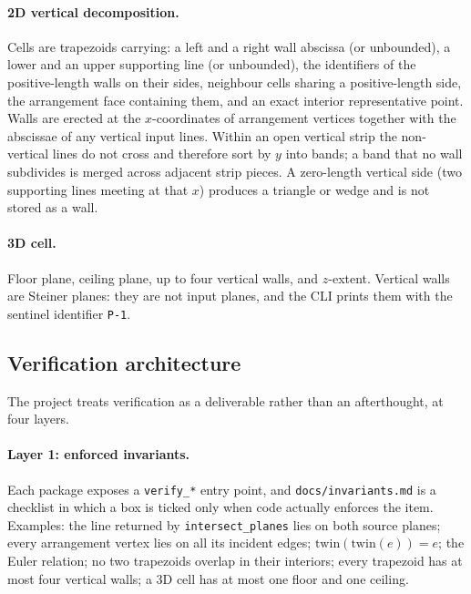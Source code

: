 \documentclass[11pt]{article}
\begin{document}
\paragraph{2D vertical decomposition.}
Cells are trapezoids carrying: a left and a right wall abscissa (or unbounded),
a lower and an upper supporting line (or unbounded), the identifiers of the
positive-length walls on their sides, neighbour cells sharing a positive-length
side, the arrangement face containing them, and an exact interior
representative point.  Walls are erected at the $x$-coordinates of arrangement
vertices together with the abscissae of any vertical input lines.  Within an
open vertical strip the non-vertical lines do not cross and therefore sort by
$y$ into bands; a band that no wall subdivides is merged across adjacent strip
pieces.  A zero-length vertical side (two supporting lines meeting at that $x$)
produces a triangle or wedge and is not stored as a wall.

\paragraph{3D cell.}
Floor plane, ceiling plane, up to four vertical walls, and $z$-extent.
Vertical walls are Steiner planes: they are not input planes, and the CLI
prints them with the sentinel identifier \texttt{P-1}.

\subsection{Verification architecture}
\label{sec:verification}

The project treats verification as a deliverable rather than an afterthought,
at four layers.

\paragraph{Layer 1: enforced invariants.}
Each package exposes a \texttt{verify\_*} entry point, and
\texttt{docs/invariants.md} is a checklist in which a box is ticked only when
code actually enforces the item.  Examples: the line returned by
\texttt{intersect\_planes} lies on both source planes; every arrangement vertex
lies on all its incident edges; $\mathrm{twin}(\mathrm{twin}(e)) = e$; the
Euler relation; no two trapezoids overlap in their interiors; every trapezoid
has at most four vertical walls; a 3D cell has at most one floor and one
ceiling.
\end{document}
